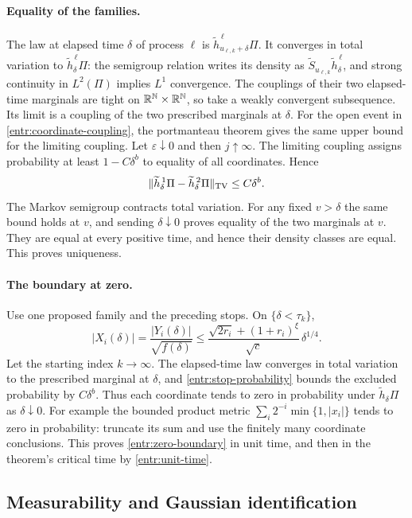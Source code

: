 \paragraph{Equality of the families.}
The law at elapsed time \(\delta\) of process \(\ell\) is
\(\widetilde h^{\,\ell}_{u_{\ell,k}+\delta}\Pi\).  It converges
in total variation to \(\widetilde h^{\,\ell}_\delta\Pi\):
the semigroup relation writes its density as
\(\widetilde S_{u_{\ell,k}}\widetilde h^{\,\ell}_\delta\), and
strong continuity in \(L^2(\Pi)\) implies \(L^1\) convergence.
The couplings of their two elapsed-time marginals are tight on
\(\mathbb R^\mathbb N\times\mathbb R^\mathbb N\), so take a weakly convergent subsequence.
Its limit is a coupling of the two prescribed marginals at
\(\delta\).  For the open event in
\eqref{entr:coordinate-coupling}, the portmanteau theorem gives the
same upper bound for the limiting coupling.  Let
\(\varepsilon\downarrow0\) and then \(j\uparrow\infty\).
The limiting coupling assigns probability at least \(1-C\delta^b\)
to equality of all coordinates.  Hence
\[
 \|\widetilde h^{\,1}_\delta\Pi
          -\widetilde h^{\,2}_\delta\Pi\|_{\operatorname{TV}}\le C\delta^b.
\]
The Markov semigroup contracts total variation.  For any fixed
\(v>\delta\) the same bound holds at \(v\), and sending
\(\delta\downarrow0\) proves equality of the two marginals at \(v\).
They are equal at every positive time, and hence their density classes
are equal.  This proves uniqueness.

\paragraph{The boundary at zero.}
Use one proposed family and the preceding stops.  On
\(\{\delta<\tau_k\}\),
\[
 |X_i(\delta)|
 =\frac{|Y_i(\delta)|}{\sqrt{f(\delta)}}
 \le \frac{\sqrt{2r_i}+(1+r_i)^\xi}{\sqrt c}\,\delta^{1/4}.
\]
Let the starting index \(k\to\infty\).  The elapsed-time law
converges in total variation to the prescribed marginal at \(\delta\),
and \eqref{entr:stop-probability} bounds the excluded probability by
\(C\delta^b\).  Thus each coordinate tends to zero in probability
under \(\widetilde h_\delta\Pi\) as \(\delta\downarrow0\).
For example the bounded product metric
\(\sum_i2^{-i}\min\{1,|x_i|\}\) tends to zero in probability:
truncate its sum and use the finitely many coordinate conclusions.
This proves \eqref{entr:zero-boundary} in unit time, and then in
the theorem's critical time by \eqref{entr:unit-time}.

\subsection{Measurability and Gaussian identification}

